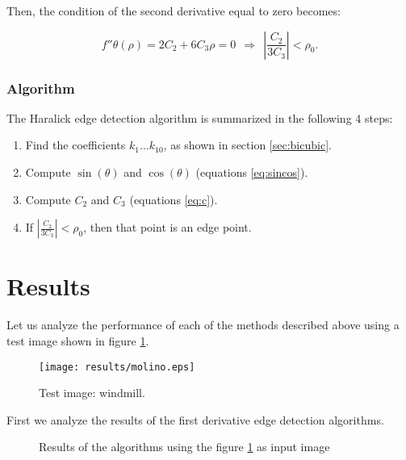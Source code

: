 \documentclass{ipol}
\numberwithin{equation}{section}
\numberwithin{table}{section}
\numberwithin{figure}{section}
\begin{document}
Then, the condition of the second derivative equal to zero becomes:

\begin{equation}
	f''{\theta}(\rho) = 2C_2 + 6C_3\rho = 0 \ \ \Rightarrow \ \ \left| \frac{C_2}{3C_3} \right| < \rho_0.
\end{equation}

\subsubsection{Algorithm}

The Haralick edge detection algorithm is summarized in the following 4 steps:

\begin{enumerate}
	\item Find the coefficients $k_1 \hdots k_{10}$, as shown in section \ref{sec:bicubic}.
	\item Compute $\sin(\theta)$ and $\cos(\theta)$ (equations \ref{eq:sincos}).
	\item Compute $C_2$ and $C_3$ (equations \ref{eq:c}).
	\item If $\left| \frac{C_2}{3C_3} \right| < \rho_0$, then that point is an edge point.
\end{enumerate}

\section{Results}
\label{sec:results}

Let us analyze the performance of each of the methods described above using a test image shown in figure \ref{fig:original}. 

\begin{figure}[h!]
	\centering
	\texttt{[image: results/molino.eps]}
	\caption{Test image: windmill.}
	\label{fig:original}
\end{figure}

First we analyze the results of the first derivative edge detection algorithms. 

\begin{figure}[h!]
	\centering
	
	
	\caption{Results of the algorithms using the figure \ref{fig:original} as input image}
	\label{fig:result1}
\end{figure}
\end{document}
